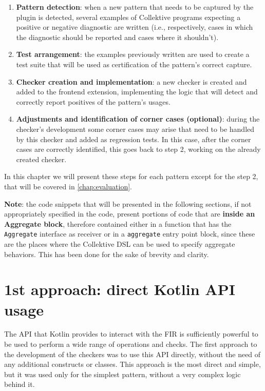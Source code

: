 \documentclass[12pt,a4paper,openright,twoside]{book}
\begin{document}
\begin{enumerate}
  \item \textbf{Pattern detection}: when a new pattern that needs to be captured
  by the plugin is detected, several examples of Collektive programs expecting a
  positive or negative  diagnostic are written (i.e., respectively, cases in
  which the diagnostic should be reported and cases where it shouldn't).
  \item \textbf{Test arrangement}: the examples previously written are used to 
  create a test suite that will be used as certification of the pattern's correct
  capture. 
  \item \textbf{Checker creation and implementation}: a new checker is created and
  added to the frontend extension, implementing the logic that will detect and 
  correctly report positives of the pattern's usages.
  \item \textbf{Adjustments and identification of corner cases (optional)}: during
  the checker's development some corner cases may arise that need to be handled 
  by this checker and added as regression tests. In this case, after the corner 
  cases are correctly identified, this goes back to step 2, working on the already
  created checker.
\end{enumerate}

In this chapter we will present these steps for each pattern except for the step
2, that will be covered in \cref{chap:evaluation}. 

\textbf{Note}: the code snippets that will be presented in the following
sections, if not appropriately specified in the code, present portions of code
that are \textbf{inside an Aggregate block}, therefore contained either in a
function that has the \lstinline{Aggregate} interface as receiver or in a 
\lstinline{aggregate} entry point block, since these are the places where 
the Collektive DSL can be used to specify aggregate behaviors. This has been
done for the sake of brevity and clarity.

\section{1st approach: direct Kotlin API usage}

The API that Kotlin provides to interact with the \ac{FIR} is sufficiently
powerful to be used to perform a wide range of operations and checks. The
first approach to the development of the checkers was to use this API directly,
without the need of any additional constructs or classes. This approach is the
most direct and simple, but it was used only for the simplest pattern, without a
very complex logic behind it.
\end{document}
